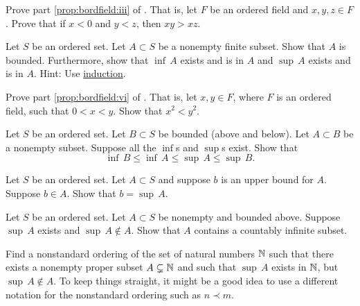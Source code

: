 \begin{exercise}
Prove part \ref{prop:bordfield:iii} of .
That is, let $F$ be an ordered field and $x,y,z \in F$.  Prove
that
if $x < 0$ and $y < z$, then $xy > xz$.
\end{exercise}


\begin{exercise} \label{exercise:finitesethasminmax}
Let $S$ be an ordered set.  Let $A \subset S$ be a nonempty finite subset.
Show that $A$ is bounded.  Furthermore,
show that
$\inf\, A$ exists and is in $A$ and
$\sup\, A$ exists and is in $A$.
Hint: Use \hyperref[induction:thm]{induction}.
\end{exercise}

\begin{exercise} \label{exercise:squareineq}
Prove part \ref{prop:bordfield:vi} of .
That is, let $x, y \in F$, where $F$ is an ordered field, such that
$0 < x < y$.  Show that $x^2 < y^2$.
\end{exercise}

\begin{exercise}
Let $S$ be an ordered set.  Let $B \subset S$ be bounded (above and
below).  Let $A \subset B$ be a nonempty subset.
Suppose all the $\inf$s and
$\sup$s exist. Show that
\begin{equation*}
\inf\, B \leq \inf\, A \leq \sup\, A \leq \sup\, B .
\end{equation*}
\end{exercise}

\begin{exercise}
Let $S$ be an ordered set.  Let $A \subset S$ and suppose
$b$ is an upper bound for $A$.  Suppose $b \in A$.  Show
that $b = \sup\, A$.
\end{exercise}

\begin{exercise}
Let $S$ be an ordered set.  Let $A \subset S$ be nonempty and
bounded above.
Suppose $\sup\, A$ exists and
$\sup\, A \notin A$.
Show that $A$ contains a countably infinite
subset.
\end{exercise}

\begin{exercise}
Find a nonstandard ordering of the set of natural numbers ${\mathbb{N}}$
such that there exists a nonempty proper subset $A \subsetneq {\mathbb{N}}$
and such that $\sup\, A$ exists in ${\mathbb{N}}$, but $\sup\, A \notin A$.
To keep things straight, it might be a good idea to use a different
notation for the nonstandard ordering such as $n \prec m$.
\end{exercise}

